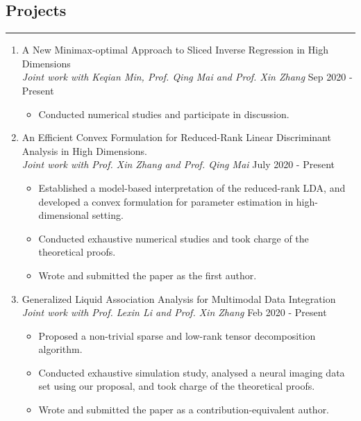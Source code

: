 \documentclass[10pt, oneside]{article}
\begin{document}
\subsection*{Projects}
\noindent\rule{\textwidth}{1pt}
\begin{enumerate}[itemsep=0pt]
    \item A New Minimax-optimal Approach to Sliced Inverse Regression in High Dimensions\\
    \textit{Joint work with Keqian Min, Prof. Qing Mai and Prof. Xin Zhang} \hfill Sep 2020 - Present
    \begin{itemize}[topsep=-2pt,itemsep=-1pt]
        \item Conducted numerical studies and participate in discussion.
    \end{itemize}
    \item An Efficient Convex Formulation for Reduced-Rank Linear Discriminant Analysis in High Dimensions.\\
    \textit{Joint work with Prof. Xin Zhang and Prof. Qing Mai} \hfill July 2020 - Present
    \begin{itemize}[topsep=-2pt,itemsep=-1pt]
        \item Established a model-based interpretation of the reduced-rank LDA, and developed a convex formulation for parameter estimation in high-dimensional setting.
        \item Conducted exhaustive numerical studies and took charge of the theoretical proofs.
        \item Wrote and submitted the paper as the first author.
    \end{itemize}
    \item Generalized Liquid Association Analysis for Multimodal Data Integration \\
    \textit{Joint work with Prof. Lexin Li and Prof. Xin Zhang} \hfill Feb 2020 - Present
    \begin{itemize}[topsep=-2pt,itemsep=-1pt]
        \item Proposed a non-trivial sparse and low-rank tensor decomposition algorithm.
        \item Conducted exhaustive simulation study, analysed a neural imaging data set using our proposal, and took charge of the theoretical proofs.
        \item Wrote and submitted the paper as a contribution-equivalent author.
    \end{itemize}


\end{enumerate}
\end{document}
